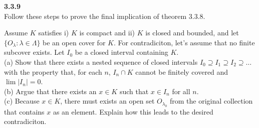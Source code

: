 \textbf{3.3.9}
\\

Follow these steps to prove the final implication of theorem 3.3.8.

Assume $K$ satisfies i) $K$ is compact and ii) $K$ is closed and bounded, and let
$\{ O_\lambda : \lambda \in \Lambda \}$ be an open cover for $K$.
For contradiciton, let's assume that no finite subcover exists.
Let $I_0$ be a closed interval containing $K$.
\\

(a) Show that there exists a nested sequence of closed intervals $I_0 \supseteq I_1 \supseteq I_2 \supseteq \ldots$
with the property that, for each $n$, $I_n \cap K$ cannot be finitely covered and $\lim |I_n| = 0$.
\\

(b) Argue that there exists an $x\in K$ such that $x \in I_n$ for all $n$.
\\

(c) Because $x\in K$, there must exists an open set $O_{\lambda_0}$ from the original collection that
contains $x$ as an element.
Explain how this leads to the desired contradiciton.
\\